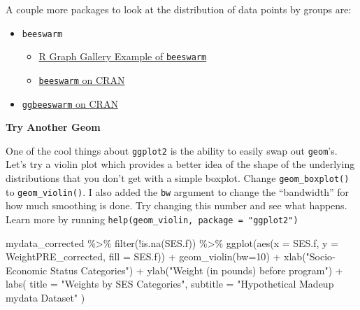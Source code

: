 \documentclass[
  letterpaper,
  DIV=11,
  numbers=noendperiod]{scrartcl}
\newenvironment{Shaded}{\begin{snugshade}}{\end{snugshade}}
\newcommand{\AttributeTok}[1]{\textcolor[rgb]{0.40,0.45,0.13}{#1}}
\newcommand{\DecValTok}[1]{\textcolor[rgb]{0.68,0.00,0.00}{#1}}
\newcommand{\FunctionTok}[1]{\textcolor[rgb]{0.28,0.35,0.67}{#1}}
\newcommand{\NormalTok}[1]{\textcolor[rgb]{0.00,0.23,0.31}{#1}}
\newcommand{\SpecialCharTok}[1]{\textcolor[rgb]{0.37,0.37,0.37}{#1}}
\newcommand{\StringTok}[1]{\textcolor[rgb]{0.13,0.47,0.30}{#1}}
\providecommand{\tightlist}{%
  \setlength{\itemsep}{0pt}\setlength{\parskip}{0pt}}\usepackage{longtable,booktabs,array}
\begin{document}
A couple more packages to look at the distribution of data points by
groups are:

\begin{itemize}
\tightlist
\item
  \texttt{beeswarm}

  \begin{itemize}
  \tightlist
  \item
    \href{https://r-graph-gallery.com/beeswarm.html}{R Graph Gallery
    Example of \texttt{beeswarm}}
  \item
    \href{https://cran.r-project.org/web/packages/beeswarm/index.html}{\texttt{beeswarm}
    on CRAN}
  \end{itemize}
\item
  \href{https://cran.r-project.org/web/packages/ggbeeswarm/index.html}{\texttt{ggbeeswarm}
  on CRAN}
\end{itemize}

\newpage

\textbf{Try Another Geom}

One of the cool things about \texttt{ggplot2} is the ability to easily
swap out \texttt{geom}'s. Let's try a violin plot which provides a
better idea of the shape of the underlying distributions that you don't
get with a simple boxplot. Change \texttt{geom\_boxplot()} to
\texttt{geom\_violin()}. I also added the \texttt{bw} argument to change
the ``bandwidth'' for how much smoothing is done. Try changing this
number and see what happens. Learn more by running
\texttt{help(geom\_violin,\ package\ =\ "ggplot2")}

\begin{Shaded}
\begin{Highlighting}[]
\NormalTok{mydata\_corrected }\SpecialCharTok{\%\textgreater{}\%}
  \FunctionTok{filter}\NormalTok{(}\SpecialCharTok{!}\FunctionTok{is.na}\NormalTok{(SES.f)) }\SpecialCharTok{\%\textgreater{}\%}
  \FunctionTok{ggplot}\NormalTok{(}\FunctionTok{aes}\NormalTok{(}\AttributeTok{x =}\NormalTok{ SES.f, }
             \AttributeTok{y =}\NormalTok{ WeightPRE\_corrected,}
             \AttributeTok{fill =}\NormalTok{ SES.f)) }\SpecialCharTok{+}
  \FunctionTok{geom\_violin}\NormalTok{(}\AttributeTok{bw=}\DecValTok{10}\NormalTok{) }\SpecialCharTok{+}
  \FunctionTok{xlab}\NormalTok{(}\StringTok{"Socio{-}Economic Status Categories"}\NormalTok{) }\SpecialCharTok{+}
  \FunctionTok{ylab}\NormalTok{(}\StringTok{"Weight (in pounds) before program"}\NormalTok{) }\SpecialCharTok{+}
  \FunctionTok{labs}\NormalTok{(}
    \AttributeTok{title =} \StringTok{"Weights by SES Categories"}\NormalTok{,}
    \AttributeTok{subtitle =} \StringTok{"Hypothetical Madeup mydata Dataset"}
\NormalTok{  ) }
\end{Highlighting}
\end{Shaded}
\end{document}
